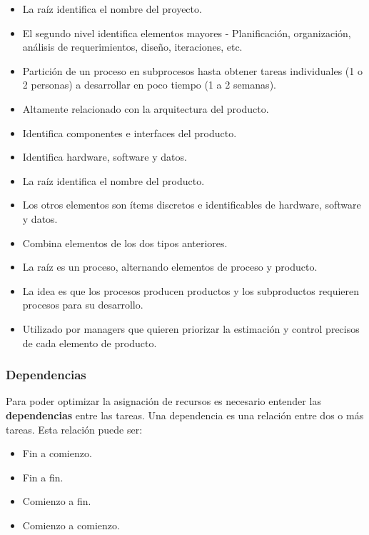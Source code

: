 \documentclass[]{article}
\begin{document}
\begin{itemize}
	\item La raíz identifica el nombre del proyecto.
	\item El segundo nivel identifica elementos mayores - Planificación, organización, análisis de requerimientos, diseño, iteraciones, etc.
	\item Partición de un proceso en subprocesos hasta obtener tareas individuales (1 o 2 personas) a desarrollar en poco tiempo (1 a 2 semanas).
\end{itemize}

\begin{itemize}
	\item Altamente relacionado con la arquitectura del producto.
	\item Identifica componentes e interfaces del producto.
	\item Identifica hardware, software y datos.
	\item La raíz identifica el nombre del producto.
	\item Los otros elementos son ítems discretos e identificables de hardware, software y datos.
\end{itemize}


\begin{itemize}
	\item Combina elementos de los dos tipos anteriores.
	\item La raíz es un proceso, alternando elementos de proceso y producto.
	\item La idea es que los procesos producen productos y los subproductos requieren procesos para su desarrollo.
	\item Utilizado por managers que quieren priorizar la estimación y control precisos de cada elemento de producto.
\end{itemize}

\subsubsection{Dependencias}
Para poder optimizar la asignación de recursos es necesario entender las \textbf{dependencias} entre las tareas. Una dependencia es una relación entre dos o más tareas. Esta relación puede ser:
\begin{itemize}
 	\item Fin a comienzo.
 	\item Fin a fin.
 	\item Comienzo a fin.
 	\item Comienzo a comienzo.
 \end{itemize}
\end{document}
